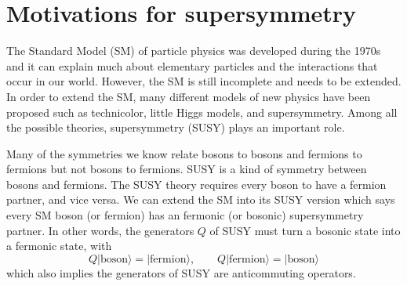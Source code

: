 \documentclass[12pt]{report}
\begin{document}
\chapter{Motivations for supersymmetry}
The Standard Model (SM) of particle physics was developed during the 1970s and it can explain much about elementary particles and the interactions that occur in our world.
However, the SM is still incomplete and needs to be extended.
In order to extend the SM, many different models of new physics have been proposed such as technicolor, little Higgs models, and supersymmetry.
Among all the possible theories, supersymmetry (SUSY) \cite{wess_and_zumino} plays an important role.

Many of the symmetries we know relate bosons to bosons and fermions to fermions but not bosons to fermions.
SUSY is a kind of symmetry between bosons and fermions.
The SUSY theory requires every boson to have a fermion partner, and vice versa.
We can extend the SM into its SUSY version which says every SM boson (or fermion) has an fermonic (or bosonic) supersymmetry partner.
In other words, the generators $Q$ of SUSY must turn a bosonic state into a fermonic state, with
\begin{equation}
Q|\mathrm{boson}\rangle = |\mathrm{fermion}\rangle, \qquad 
Q|\mathrm{fermion}\rangle = |\mathrm{boson}\rangle
\end{equation}
which also implies the generators of SUSY are anticommuting operators.
\end{document}
